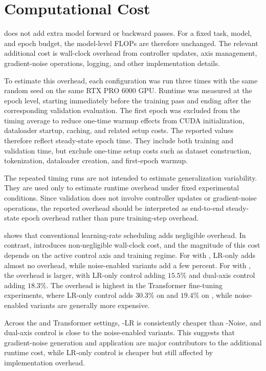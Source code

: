\section{Computational Cost}
\label{sec:computational-cost}

\method{} does not add extra model forward or backward passes. For a fixed task, model, and epoch budget, the model-level FLOPs are therefore unchanged. The relevant additional cost is wall-clock overhead from controller updates, axis management, gradient-noise operations, logging, and other implementation details.

To estimate this overhead, each configuration was run three times with the same random seed on the same RTX PRO 6000 GPU. Runtime was measured at the epoch level, starting immediately before the training pass and ending after the corresponding validation evaluation. The first epoch was excluded from the timing average to reduce one-time warmup effects from CUDA initialization, dataloader startup, caching, and related setup costs. The reported values therefore reflect steady-state epoch time. They include both training and validation time, but exclude one-time setup costs such as dataset construction, tokenization, dataloader creation, and first-epoch warmup.

The repeated timing runs are not intended to estimate generalization variability. They are used only to estimate runtime overhead under fixed experimental conditions. Since validation does not involve \method{} controller updates or gradient-noise operations, the reported overhead should be interpreted as end-to-end steady-state epoch overhead rather than pure training-step overhead.



 shows that conventional learning-rate scheduling adds negligible overhead. In contrast, \method{} introduces non-negligible wall-clock cost, and the magnitude of this cost depends on the active control axis and training regime. For \cifar{} with \sgdm{}, LR-only \method{} adds almost no overhead, while noise-enabled variants add a few percent. For \cifar{} with \adamw{}, the overhead is larger, with LR-only control adding $15.5\%$ and dual-axis control adding $18.3\%$. The overhead is highest in the Transformer fine-tuning experiments, where LR-only control adds $30.3\%$ on \sst{} and $19.4\%$ on \agnews{}, while noise-enabled variants are generally more expensive.

Across the \adamw{} and Transformer settings, \method{}-LR is consistently cheaper than \method{}-Noise, and dual-axis control is close to the noise-enabled variants. This suggests that gradient-noise generation and application are major contributors to the additional runtime cost, while LR-only control is cheaper but still affected by implementation overhead.

